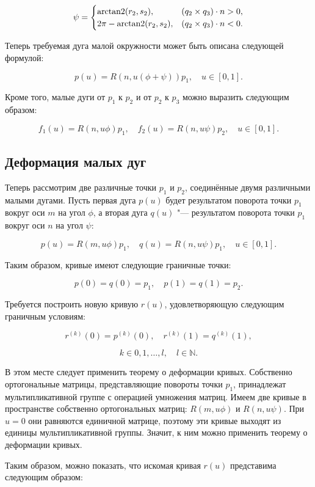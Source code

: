 \begin{equation}
\psi=
 \begin{cases}
   \operatorname{arctan2}(r_2,s_2),      & (q_2\times q_3)\cdot n>0, \\
   2\pi-\operatorname{arctan2}(r_2,s_2), & (q_2\times q_3)\cdot n<0.
 \end{cases}
\label{two-dimension-sphere-psi-angle}
\end{equation}

Теперь требуемая дуга малой окружности может быть описана следующей формулой:

$$
p(u)=R(n,u(\phi+\psi))p_1, \quad u \in [0,1].
$$

Кроме того, малые дуги от $p_1$ к $p_2$ и от $p_2$ к $p_3$ можно выразить следующим образом:

$$
f_1(u)=R(n,u\phi)p_1, \quad f_2(u)=R(n,u\psi)p_2, \quad u \in [0,1].
$$

\subsection*{Деформация малых дуг}

Теперь рассмотрим две различные точки $p_1$ и $p_2$, соединённые двумя различными малыми дугами. Пусть первая дуга
$p(u)$ будет результатом поворота точки $p_1$ вокруг оси $m$ на угол $\phi$, а вторая дуга $q(u)$ "--- результатом
поворота точки $p_1$ вокруг оси $n$ на угол $\psi$:

$$
p(u)=R(m,u\phi)p_1, \quad q(u)=R(n,u\psi)p_1, \quad u \in [0,1].
$$

Таким образом, кривые имеют следующие граничные точки:

$$
p(0)=q(0)=p_1, \quad p(1)=q(1)=p_2.
$$

Требуется построить новую кривую $r(u)$, удовлетворяющую следующим граничным условиям:

$$
r^{(k)}(0)=p^{(k)}(0), \quad r^{(k)}(1)=q^{(k)}(1),
$$

$$
k \in {0,1,\dots,l}, \quad l \in \mathbb{N}.
$$

В этом месте следует применить теорему о деформации кривых. Собственно ортогональные матрицы, представляющие повороты
точки $p_1$, принадлежат мультипликативной группе с операцией умножения матриц. Имеем две кривые в пространстве
собственно ортогональных матриц: $R(m,u\phi)$ и $R(n,u\psi)$. При $u=0$ они равняются единичной матрице, поэтому эти
кривые выходят из единицы мультипликативной группы. Значит, к ним можно применить теорему о деформации кривых.

Таким образом, можно показать, что искомая кривая $r(u)$ представима следующим образом:

